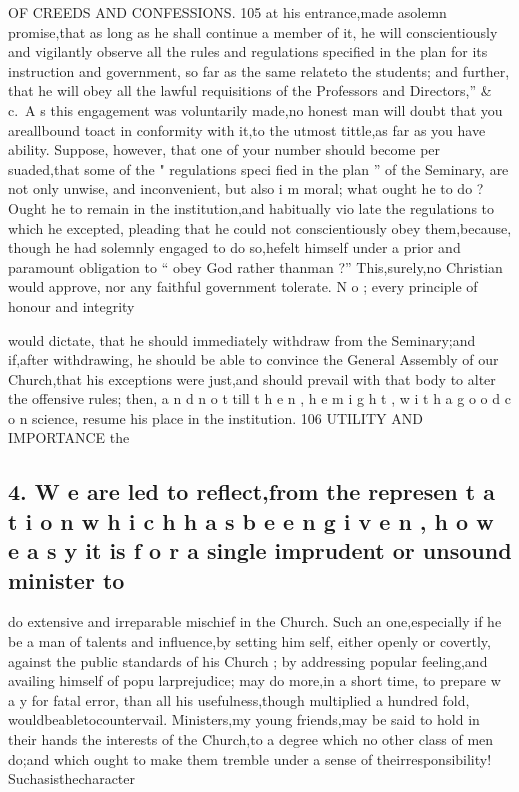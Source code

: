 \documentclass[
]{book}
\begin{document}
OF CREEDS AND CONFESSIONS. 105
at his entrance,made asolemn promise,that as long as he shall continue a member of it, he will conscientiously and vigilantly observe all the rules and regulations specified in the plan for its instruction and government, so far as the same relateto the students; and further, that he will obey all the lawful requisitions of the Professors and Directors,'' \& c.~A s this
engagement was voluntarily made,no honest man will doubt that you areallbound toact
in conformity with it,to the utmost tittle,as far as you have ability. Suppose, however, that one of your number should become per suaded,that some of the " regulations speci fied in the plan '' of the Seminary, are not only unwise, and inconvenient, but also i m moral; what ought he to do ? Ought he to remain in the institution,and habitually vio late the regulations to which he excepted,
pleading that he could not conscientiously obey them,because, though he had solemnly engaged to do so,hefelt himself under a prior and paramount obligation to `` obey God rather thanman ?'' This,surely,no Christian would approve, nor any faithful government tolerate. N o ; every principle of honour and integrity

would dictate, that he should immediately withdraw from the Seminary;and if,after withdrawing, he should be able to convince the General Assembly of our Church,that his exceptions were just,and should prevail with that body to alter the offensive rules; then, a n d n o t till t h e n , h e m i g h t , w i t h a g o o d c o n
science, resume his place in the institution.
106 UTILITY AND IMPORTANCE
the

\hypertarget{w-e-are-led-to-reflectfrom-the-represen-t-a-t-i-o-n-w-h-i-c-h-h-a-s-b-e-e-n-g-i-v-e-n-h-o-w-e-a-s-y-it-is-f-o-r-a-single-imprudent-or-unsound-minister-to}{%
\subsection{4. W e are led to reflect,from the represen t a t i o n w h i c h h a s b e e n g i v e n , h o w e a s y it is f o r a single imprudent or unsound minister to}\label{w-e-are-led-to-reflectfrom-the-represen-t-a-t-i-o-n-w-h-i-c-h-h-a-s-b-e-e-n-g-i-v-e-n-h-o-w-e-a-s-y-it-is-f-o-r-a-single-imprudent-or-unsound-minister-to}}

do extensive and irreparable mischief in the Church. Such an one,especially if he be a man of talents and influence,by setting him self, either openly or covertly, against the public standards of his Church ; by addressing popular feeling,and availing himself of popu larprejudice; may do more,in a short time, to prepare w a y for fatal error, than all his usefulness,though multiplied a hundred fold, wouldbeabletocountervail. Ministers,my young friends,may be said to hold in their
hands the interests of the Church,to a degree which no other class of men do;and which ought to make them tremble under a sense of theirresponsibility! Suchasisthecharacter
\end{document}
